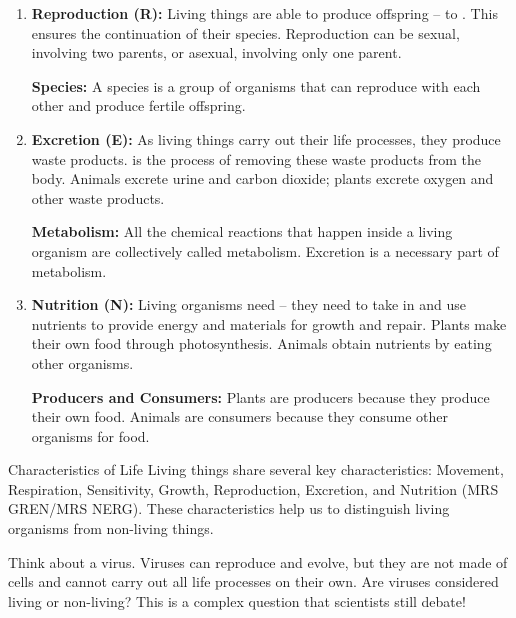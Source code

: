 \begin{enumerate}
\begin{marginnote}
    \end{marginnote}
    \item \textbf{Reproduction (R):} Living things are able to produce offspring – to . This ensures the continuation of their species. Reproduction can be sexual, involving two parents, or asexual, involving only one parent.
    \begin{marginnote}
        \textbf{Species:} A species is a group of organisms that can reproduce with each other and produce fertile offspring.
    \end{marginnote}
    \item \textbf{Excretion (E):}  As living things carry out their life processes, they produce waste products.  is the process of removing these waste products from the body. Animals excrete urine and carbon dioxide; plants excrete oxygen and other waste products.
    \begin{marginnote}
        \textbf{Metabolism:} All the chemical reactions that happen inside a living organism are collectively called metabolism. Excretion is a necessary part of metabolism.
    \end{marginnote}
    \item \textbf{Nutrition (N):} Living organisms need  – they need to take in and use nutrients to provide energy and materials for growth and repair.  Plants make their own food through photosynthesis. Animals obtain nutrients by eating other organisms.
    \begin{marginnote}
        \textbf{Producers and Consumers:} Plants are producers because they produce their own food. Animals are consumers because they consume other organisms for food.
    \end{marginnote}
\end{enumerate}

\begin{keyconcept}{Characteristics of Life}
Living things share several key characteristics: Movement, Respiration, Sensitivity, Growth, Reproduction, Excretion, and Nutrition (MRS GREN/MRS NERG).  These characteristics help us to distinguish living organisms from non-living things.
\end{keyconcept}

\begin{stopandthink}
Think about a virus. Viruses can reproduce and evolve, but they are not made of cells and cannot carry out all life processes on their own.  Are viruses considered living or non-living? This is a complex question that scientists still debate!
\end{stopandthink}


